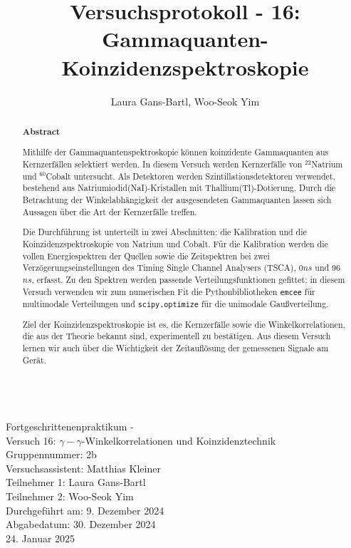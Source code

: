 \documentclass[%
aps,
onecolumn,
11pt,
tightenlines,
nofootinbib,
superscriptaddress,
floatfix,
prd,
]{revtex4-2}
\begin{document}
\title{\large Versuchsprotokoll - 16: Gammaquanten-Koinzidenzspektroskopie}

\author{Laura Gans-Bartl, Woo-Seok Yim}

\begin{abstract} 
	\vs{3mm}
	\centering
\begin{tcolorbox}
	\begin{center}		
		\textbf{Abstract}
	\end{center}\par
Mithilfe der Gammaquantenspektroskopie können koinzidente Gammaquanten aus Kernzerfällen selektiert werden. In diesem Versuch werden Kernzerfälle von $^{22}$Natrium und $^{60}$Cobalt untersucht. Als Detektoren werden Szintillationsdetektoren verwendet, bestehend aus Natriumiodid(NaI)-Kristallen mit Thallium(Tl)-Dotierung. Durch die Betrachtung der Winkelabhängigkeit der ausgesendeten Gammaquanten lassen sich Aussagen über die Art der Kernzerfälle treffen.\par 
Die Durchführung ist unterteilt in zwei Abschnitten: die Kalibration und die Koinzidenzspektroskopie von Natrium und Cobalt. Für die Kalibration werden die vollen Energiespektren der Quellen sowie die Zeitspektren bei zwei Verzögerungseinstellungen des Timing Single Channel Analysers (TSCA), 0$ns$ und 96$ns$, erfasst. Zu den Spektren werden passende Verteilungsfunktionen gefittet; in diesem Versuch verwenden wir zum numerischen Fit die Pythonbibliotheken \texttt{emcee} für multimodale Verteilungen und \texttt{scipy.optimize} für die unimodale Gaußverteilung.\par
Ziel der Koinzidenzspektroskopie ist es, die Kernzerfälle sowie die Winkelkorrelationen, die aus der Theorie bekannt sind, experimentell zu bestätigen. Aus diesem Versuch lernen wir auch über die Wichtigkeit der Zeitauflösung der gemessenen Signale am Gerät.
\end{tcolorbox}
\end{abstract}
\begin{center}
	\\
	{\fontsize{20}{10}\selectfont Fortgeschrittenenpraktikum - \\[5mm]
	Versuch 16: $\gamma - \gamma$-Winkelkorrelationen und Koinzidenztechnik\\ [10mm]
	Gruppennummer: 2b\\[5mm]
	Versuchsassistent: Matthias Kleiner\\[5mm]
	Teilnehmer 1: Laura Gans-Bartl \\[5mm]
	Teilnehmer 2: Woo-Seok Yim \\[5mm]
	Durchgeführt am: 9. Dezember 2024 \\[5mm]
	Abgabedatum: 30. Dezember 2024 \\
		\hspace{100pt} 24. Januar 2025}
\end{center}
\newpage
\maketitle
\newpage
\tableofcontents
\newpage
\end{document}
